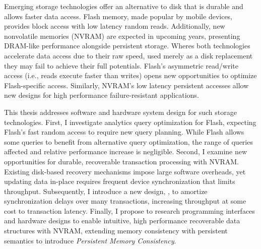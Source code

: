 Emerging storage technologies offer an alternative to disk that is durable and allows faster data access.
Flash memory, made popular by mobile devices, provides block access with low latency random reads.
Additionally, new nonvolatile memories (NVRAM) are expected in upcoming years, presenting DRAM-like performance alongside persistent storage.
Wheres both technologies accelerate data access due to their raw speed, used merely as a disk replacement they may fail to achieve their full potentials.
Flash's asymmetric read/write access (i.e., reads execute faster than writes) opens new opportunities to optimize Flash-specific access.
Similarly, NVRAM's low latency persistent accesses allow new designs for high performance failure-resistant applications.

This thesis addresses software and hardware system design for such storage technologies.
First, I investigate analytics query optimization for Flash, expecting Flash's fast random access to require new query planning.
While Flash allows some queries to benefit from alternative query optimization, the range of queries affected and relative performance increase is negligible.
Second, I examine new opportunities for durable, recoverable transaction processing with NVRAM.
Existing disk-based recovery mechanisms impose large software overheads, yet updating data in-place requires frequent device synchronization that limits throughput.
Subsequently, I introduce a new design, \GroupCommit, to amortize synchronization delays over many transactions, increasing throughput at some cost to transaction latency.
Finally, I propose to research programming interfaces and hardware designs to enable intuitive, high performance recoverable data structures with NVRAM, extending memory consistency with persistent semantics to introduce \emph{Persistent Memory Consistency}.
